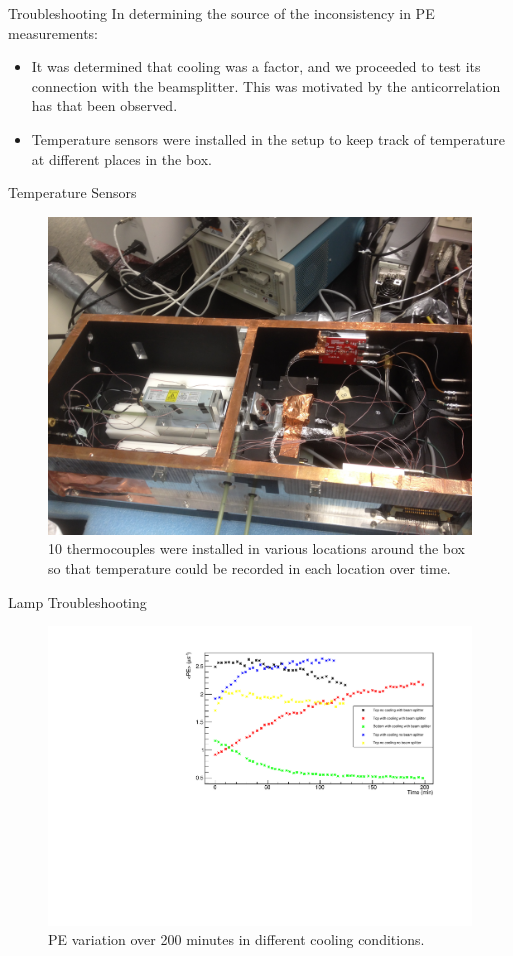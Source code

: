 \documentclass{beamer}
\begin{document}
\begin{frame}{Troubleshooting}
In determining the source of the inconsistency in PE measurements:\\
\begin{itemize}
\item It was determined that cooling was a factor, and we proceeded to test its connection with the beamsplitter. This was motivated by the anticorrelation has that been observed.
\item Temperature sensors were installed in the setup to keep track of temperature at different places in the box.
\end{itemize}
\end{frame}

\begin{frame}{Temperature Sensors}
\begin{figure}
\centering
\includegraphics[height=0.5\textwidth]{sensors.JPG}
\caption{10 thermocouples were installed in various locations around the box so that temperature could be recorded in each location over time.}
\end{figure}
\end{frame}

\begin{frame}{Lamp Troubleshooting}
\begin{figure}
\centering
\includegraphics[height=0.5\textwidth]{NewLampPEAug5.pdf}
\caption{PE variation over 200 minutes in different cooling conditions.}
\end{figure}
\end{frame}
\end{document}
